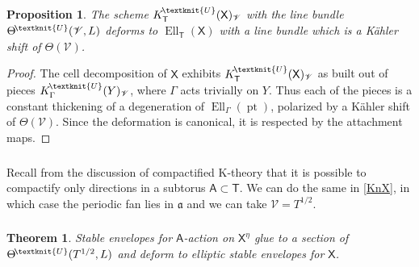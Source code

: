 \documentclass[14pt]{extarticle}
\newcommand{\Kn}{K^{\! \tiny\textknit{U}}}
\newcommand{\Thn}{\Theta^{\! \tiny\textknit{U}}}
\newcommand{\bT}{\mathsf{T}}
\newcommand{\bA}{\mathsf{A}}
\newcommand{\bX}{\mathsf{X}}
\newcommand{\cQ}{\mathscr{Q}}
\newcommand{\cV}{\mathscr{V}}
\newcommand{\fa}{\mathfrak{a}}
\DeclareMathOperator{\Ell}{Ell}
\DeclareMathOperator{\pt}{pt}
\newtheorem{Theorem}{Theorem}
\newtheorem{Proposition}[Lemma]{Proposition}
\theoremstyle{definition}
\begin{document}
\subsubsection{}

\begin{Proposition}
The scheme $\Kn_{\bT}(\bX)_{\cV}$ with the line bundle $\Thn(\cV,L)$ deforms to $\Ell_\bT(\bX)$ with a
line bundle which is a K\"ahler shift of $\Theta(\cV)$. 
\end{Proposition}

\begin{proof}
The cell decomposition of $\bX$ exhibits $\Kn_{\bT}(\bX)_{\cV}$ as
built out of pieces $\Kn_{\Gamma}(Y)_{\cV}$, where $\Gamma$ acts
trivially on $Y$. Thus each of the pieces 
is a constant thickening of a degeneration of 
$\Ell_{\Gamma}(\pt)$, polarized by a K\"ahler shift of $\Theta(\cV)$. Since the deformation is canonical, it is
respected by the attachment maps. 
\end{proof}



\subsubsection{}
Recall from the discussion of compactified K-theory that it is
possible to compactify only directions in a subtorus $\bA \subset
\bT$. We can do the same in \eqref{KnX}, in which case the periodic
fan lies in $\fa$ and we can take $\cV= T^{1/2}$. 

\subsubsection{}
  \begin{Theorem}
    Stable envelopes for $\bA$-action on $\bX^\eta$ glue to a section of
    $\Thn(T^{1/2},L)$ and deform to elliptic stable envelopes for
    $\bX$. 
  \end{Theorem}
\end{document}
